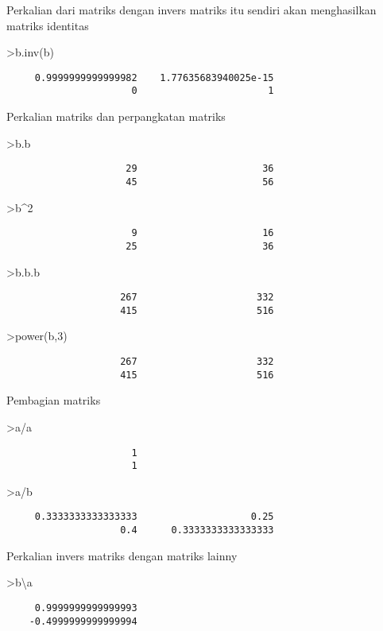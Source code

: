 \documentclass[
]{book}
\begin{document}
Perkalian dari matriks dengan invers matriks itu sendiri akan menghasilkan matriks identitas

\textgreater b.inv(b)

\begin{verbatim}
     0.9999999999999982    1.77635683940025e-15 
                      0                       1 
\end{verbatim}

Perkalian matriks dan perpangkatan matriks

\textgreater b.b

\begin{verbatim}
                     29                      36 
                     45                      56 
\end{verbatim}

\textgreater b\^{}2

\begin{verbatim}
                      9                      16 
                     25                      36 
\end{verbatim}

\textgreater b.b.b

\begin{verbatim}
                    267                     332 
                    415                     516 
\end{verbatim}

\textgreater power(b,3)

\begin{verbatim}
                    267                     332 
                    415                     516 
\end{verbatim}

Pembagian matriks

\textgreater a/a

\begin{verbatim}
                      1 
                      1 
\end{verbatim}

\textgreater a/b

\begin{verbatim}
     0.3333333333333333                    0.25 
                    0.4      0.3333333333333333 
\end{verbatim}

Perkalian invers matriks dengan matriks lainny

\textgreater b\textbackslash a

\begin{verbatim}
     0.9999999999999993 
    -0.4999999999999994 
\end{verbatim}
\end{document}
